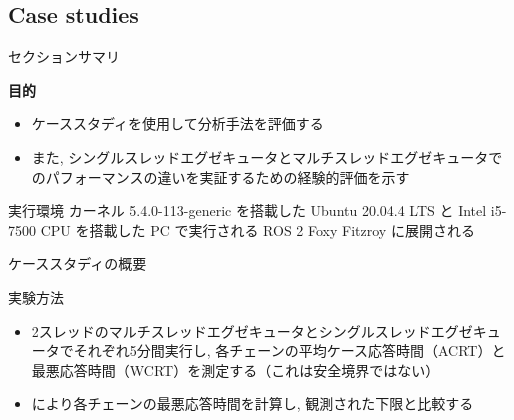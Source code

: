\subsection{Case studies}
\label{ssec: case studies}

\begin{frame}{セクションサマリ}
    \begin{itembox}[l]{\textbf{目的}}
        \begin{itemize}
            \item ケーススタディを使用して分析手法を評価する
            \item また, シングルスレッドエグゼキュータとマルチスレッドエグゼキュータでのパフォーマンスの違いを実証するための経験的評価を示す
        \end{itemize}
    \end{itembox}
\end{frame}

\begin{frame}{実行環境}
    カーネル 5.4.0-113-generic を搭載した Ubuntu 20.04.4 LTS と Intel i5-7500 CPU を搭載した PC で実行される ROS 2 Foxy Fitzroy に展開される
\end{frame}


\begin{frame}{ケーススタディの概要}
\end{frame}

\begin{frame}{実験方法}
    \begin{itemize}
        \item 2スレッドのマルチスレッドエグゼキュータとシングルスレッドエグゼキュータでそれぞれ5分間実行し, 各チェーンの平均ケース応答時間（ACRT）と最悪応答時間（WCRT）を測定する（これは安全境界ではない）
        \item {} により各チェーンの最悪応答時間を計算し, 観測された下限と比較する
    \end{itemize}
\end{frame}


